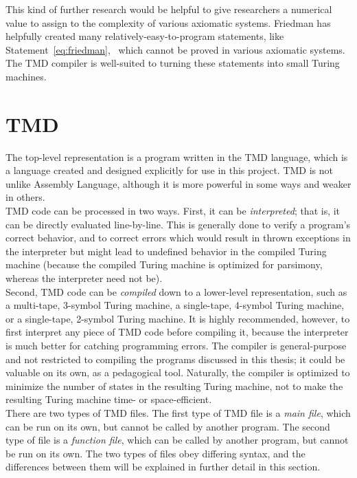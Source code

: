 \documentclass[11pt]{report}
\begin{document}
This kind of further research would be helpful to give researchers a numerical value to assign to the complexity of various axiomatic systems. Friedman has helpfully created many relatively-easy-to-program statements, like Statement~\ref{eq:friedman},~\cite{friedmanlist} which cannot be proved in various axiomatic systems. The TMD compiler is well-suited to turning these statements into small Turing machines.

\section{TMD}

The top-level representation is a program written in the TMD language, which is a language created and designed explicitly for use in this project. TMD is not unlike Assembly Language, although it is more powerful in some ways and weaker in others. \\

TMD code can be processed in two ways. First, it can be \emph{interpreted}; that is, it can be directly evaluated line-by-line. This is generally done to verify a program's correct behavior, and to correct errors which would result in thrown exceptions in the interpreter but might lead to undefined behavior in the compiled Turing machine (because the compiled Turing machine is optimized for parsimony, whereas the interpreter need not be). \\

Second, TMD code can be \emph{compiled} down to a lower-level representation, such as a multi-tape, 3-symbol Turing machine, a single-tape, 4-symbol Turing machine, or a single-tape, 2-symbol Turing machine. It is highly recommended, however, to first interpret any piece of TMD code before compiling it, because the interpreter is much better for catching programming errors. The compiler is general-purpose and not restricted to compiling the programs discussed in this thesis; it could be valuable on its own, as a pedagogical tool. Naturally, the compiler is optimized to minimize the number of states in the resulting Turing machine, not to make the resulting Turing machine time- or space-efficient. \\

There are two types of TMD files. The first type of TMD file is a \emph{main file}, which can be run on its own, but cannot be called by another program. The second type of file is a \emph{function file}, which can be called by another program, but cannot be run on its own. The two types of files obey differing syntax, and the differences between them will be explained in further detail in this section. \\
\end{document}
